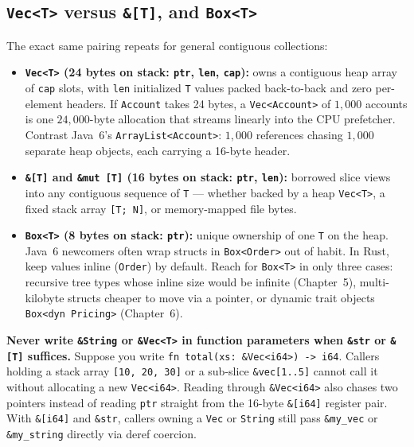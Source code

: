\subsection{\texttt{Vec<T>} versus \texttt{\&[T]}, and \texttt{Box<T>}}

The exact same pairing repeats for general contiguous collections:
\begin{itemize}
  \item \textbf{\texttt{Vec<T>} (24 bytes on stack: \texttt{ptr}, \texttt{len}, \texttt{cap}):} owns a contiguous heap array of \texttt{cap} slots, with \texttt{len} initialized \texttt{T} values packed back-to-back and zero per-element headers. If \texttt{Account} takes 24 bytes, a \texttt{Vec<Account>} of $1{,}000$ accounts is one $24{,}000$-byte allocation that streams linearly into the CPU prefetcher. Contrast Java~6's \texttt{ArrayList<Account>}: $1{,}000$ references chasing $1{,}000$ separate heap objects, each carrying a 16-byte header.
  \item \textbf{\texttt{\&[T]} and \texttt{\&mut [T]} (16 bytes on stack: \texttt{ptr}, \texttt{len}):} borrowed slice views into any contiguous sequence of \texttt{T} --- whether backed by a heap \texttt{Vec<T>}, a fixed stack array \texttt{[T; N]}, or memory-mapped file bytes.
  \item \textbf{\texttt{Box<T>} (8 bytes on stack: \texttt{ptr}):} unique ownership of one \texttt{T} on the heap. Java~6 newcomers often wrap structs in \texttt{Box<Order>} out of habit. In Rust, keep values inline (\texttt{Order}) by default. Reach for \texttt{Box<T>} in only three cases: recursive tree types whose inline size would be infinite (Chapter~5), multi-kilobyte structs cheaper to move via a pointer, or dynamic trait objects \texttt{Box<dyn Pricing>} (Chapter~6).
\end{itemize}

\begin{trapbox}
\textbf{Never write \texttt{\&String} or \texttt{\&Vec<T>} in function parameters when \texttt{\&str} or \texttt{\&[T]} suffices.} Suppose you write \texttt{fn total(xs: \&Vec<i64>) -> i64}. Callers holding a stack array \texttt{[10, 20, 30]} or a sub-slice \texttt{\&vec[1..5]} cannot call it without allocating a new \texttt{Vec<i64>}. Reading through \texttt{\&Vec<i64>} also chases two pointers instead of reading \texttt{ptr} straight from the 16-byte \texttt{\&[i64]} register pair. With \texttt{\&[i64]} and \texttt{\&str}, callers owning a \texttt{Vec} or \texttt{String} still pass \texttt{\&my\_vec} or \texttt{\&my\_string} directly via deref coercion.
\end{trapbox}

